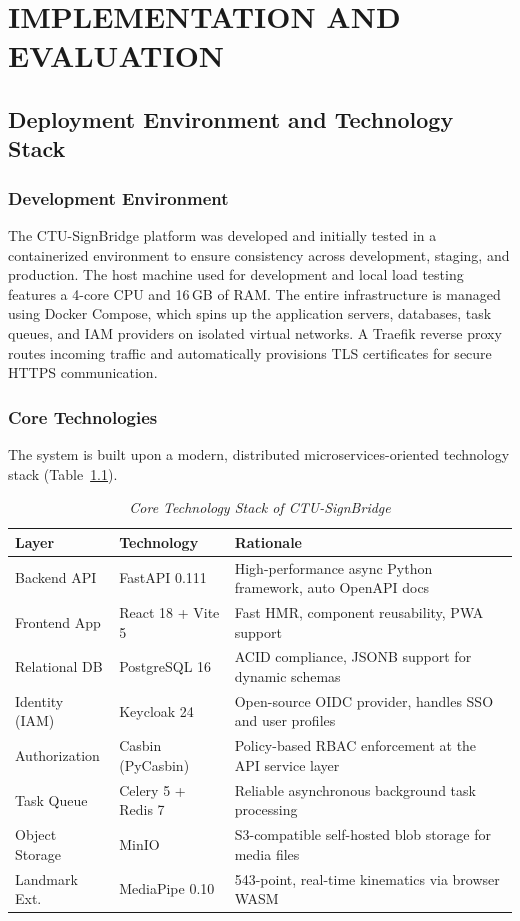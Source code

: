 \chapter{IMPLEMENTATION AND EVALUATION}

\section{Deployment Environment and Technology Stack}

\subsection{Development Environment}
The CTU-SignBridge platform was developed and initially tested in a containerized environment to ensure consistency across development, staging, and production. The host machine used for development and local load testing features a 4-core CPU and 16\,GB of RAM. The entire infrastructure is managed using Docker Compose, which spins up the application servers, databases, task queues, and IAM providers on isolated virtual networks. A Traefik reverse proxy routes incoming traffic and automatically provisions TLS certificates for secure HTTPS communication.

\subsection{Core Technologies}
The system is built upon a modern, distributed microservices-oriented technology stack (Table~\ref{tab:tech_stack}).

\begin{table}[H]
\centering
\caption{\textit{Core Technology Stack of CTU-SignBridge}}
\label{tab:tech_stack}
\small
\begin{tabularx}{\textwidth}{p{2.8cm} p{3.4cm} X}
\toprule
\textbf{Layer} & \textbf{Technology} & \textbf{Rationale} \\
\midrule
Backend API      & FastAPI 0.111       & High-performance async Python framework, auto OpenAPI docs \\
Frontend App     & React 18 + Vite 5   & Fast HMR, component reusability, PWA support \\
Relational DB    & PostgreSQL 16       & ACID compliance, JSONB support for dynamic schemas \\
Identity (IAM)   & Keycloak 24         & Open-source OIDC provider, handles SSO and user profiles \\
Authorization    & Casbin (PyCasbin)   & Policy-based RBAC enforcement at the API service layer \\
Task Queue       & Celery 5 + Redis 7  & Reliable asynchronous background task processing \\
Object Storage   & MinIO               & S3-compatible self-hosted blob storage for media files \\
Landmark Ext.    & MediaPipe 0.10      & 543-point, real-time kinematics via browser WASM \\
\bottomrule
\end{tabularx}
\end{table}

